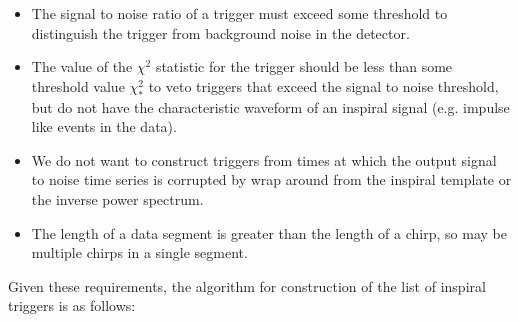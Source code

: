 \begin{itemize}
\item The signal to noise ratio of a trigger must exceed some threshold to
distinguish the trigger from background noise in the detector. 

\item The value of the $\chi^2$ statistic for the trigger should be less than
some threshold value $\chi^2_\ast$ to veto triggers that exceed the signal to
noise threshold, but do not have the characteristic waveform of an inspiral
signal (e.g. impulse like events in the data).

\item We do not want to construct triggers from times at which the output
signal to noise time series is corrupted by wrap around from the inspiral
template or the inverse power spectrum.

\item The length of a data segment is greater than the length of a chirp, so
may be multiple chirps in a single segment.
\end{itemize}

Given these requirements, the algorithm for construction of the list of
inspiral triggers is as follows:

